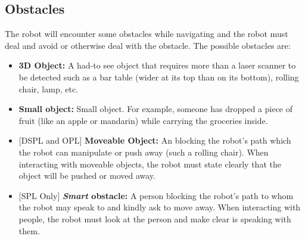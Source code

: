 \subsection{Obstacles}
The robot will encounter some obstacles while navigating and the robot must deal and avoid or otherwise deal with the obstacle. 
The possible obstacles are:
\begin{itemize}
  \item \textbf{3D Object:} A had-to see object that requires more than a laser scanner to be detected such as a bar table (wider at its top than on its bottom), rolling chair, lamp, etc.

  \item \textbf{Small object:} Small object. For example, someone has dropped a piece of fruit (like an apple or mandarin) while carrying the groceries inside.

  \item {[DSPL and OPL]} \textbf{Moveable Object:} An blocking the robot's path which the robot can manipulate or push away (such a rolling chair). When interacting with moveable objects, the robot must state clearly that the object will be pushed or moved away.

  \item {[SPL Only]} \textbf{\textit{Smart} obstacle:} A person blocking the robot's path to whom the robot may speak to and kindly ask to move away. When interacting with people, the robot must look at the person and make clear is speaking with them.
\end{itemize}


